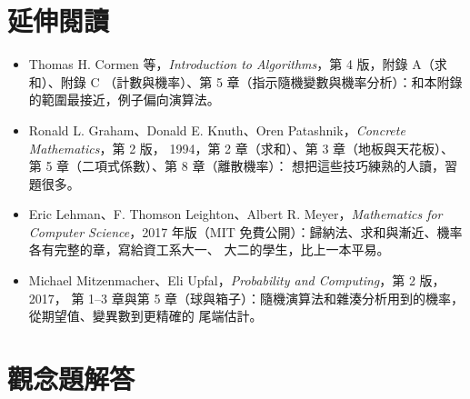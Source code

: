 \section*{延伸閱讀}

\begin{itemize}
\item Thomas H. Cormen 等，\textit{Introduction to Algorithms}，第 4 版，附錄 A（求和）、附錄 C
（計數與機率）、第 5 章（指示隨機變數與機率分析）：和本附錄的範圍最接近，例子偏向演算法。
\item Ronald L. Graham、Donald E. Knuth、Oren Patashnik，\textit{Concrete Mathematics}，第 2 版，
1994，第 2 章（求和）、第 3 章（地板與天花板）、第 5 章（二項式係數）、第 8 章（離散機率）：
想把這些技巧練熟的人讀，習題很多。
\item Eric Lehman、F. Thomson Leighton、Albert R. Meyer，\textit{Mathematics for Computer
Science}，2017 年版（MIT 免費公開）：歸納法、求和與漸近、機率各有完整的章，寫給資工系大一、
大二的學生，比上一本平易。
\item Michael Mitzenmacher、Eli Upfal，\textit{Probability and Computing}，第 2 版，2017，
第 1--3 章與第 5 章（球與箱子）：隨機演算法和雜湊分析用到的機率，從期望值、變異數到更精確的
尾端估計。
\end{itemize}

\section*{觀念題解答}


